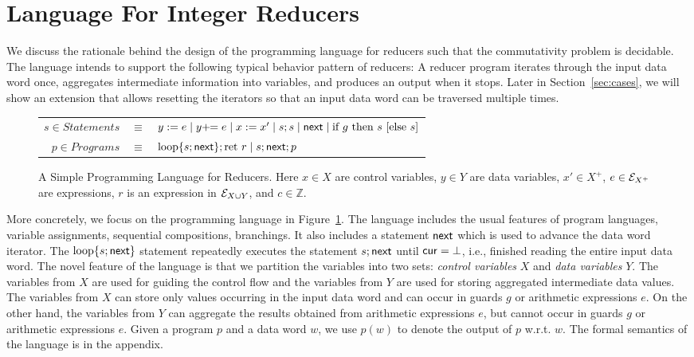  
\section{Language For Integer Reducers}\label{sec-mr-prog}
\label{sec:language}
We discuss the rationale behind the design of the programming language for reducers such that the commutativity problem is decidable. The language intends to support the following typical behavior pattern of reducers: A reducer program iterates through the input data word once, aggregates intermediate information into variables, and produces an output when it stops. 
%
Later in Section~\ref{sec:cases}, we will show an extension that allows resetting the iterators so that an input data word can be traversed multiple times.

\begin{figure}
	\vspace{-0.5cm}
	\centering
	\begin{tabular}{rcl}
        $ s \in Statements$&$\equiv$&$y := e\mid y +\!\!= e \mid x:=x'\mid s;s\mid \mathsf{next} \mid \mbox{if } g \mbox{ then } s \mbox{ [else }s\mbox{]}$\\
		$ p\in Programs$&$\equiv$&$\mbox{loop\{} s;\mathsf{next}\mbox{\}};\mbox{ret }r \mid s;\mathsf{next};p$		
	\end{tabular}
	\label{fig:language}
	\caption{A Simple Programming Language for Reducers. Here $x\in X$ are control variables, $y\in Y$ are data variables, $x' \in X^+$, $e\in {\mathcal{E} }_{X^+}$ are expressions, $r$ is an expression in ${\mathcal{E} }_{X \cup Y}$, and $c\in \mathbb{Z}$.}
	\vspace{-0.5cm}
\end{figure}

More concretely, we focus on the programming language in Figure~\ref{fig:language}. The language includes the usual features of program languages, variable assignments, sequential compositions, branchings. It also includes a statement $\mathsf{next}$ which is used to advance the data word iterator. The $\mbox{loop\{} s;\mathsf{next}\mbox{\}}$ statement repeatedly executes the statement $s;\mathsf{next}$ until $\mathsf{cur}=\bot$, i.e., finished reading the entire input data word.
The novel feature of the language is that we partition the variables into two sets: \emph{control variables} $X$ and \emph{data variables} $Y$.
The variables from $X$ are used for guiding the control flow and the variables from $Y$ are used for storing aggregated intermediate data values.
The variables from $X$ can store only values occurring in the input data word and can occur in guards $g$ or arithmetic expressions $e$.
On the other hand, the variables from $Y$ can aggregate the results obtained from arithmetic expressions $e$, but cannot occur in guards $g$ or arithmetic expressions $e$.
Given a program $p$ and a data word $w$, we use $p(w)$ to denote the output of $p$ w.r.t. $w$. The formal semantics of the language is in the appendix.

